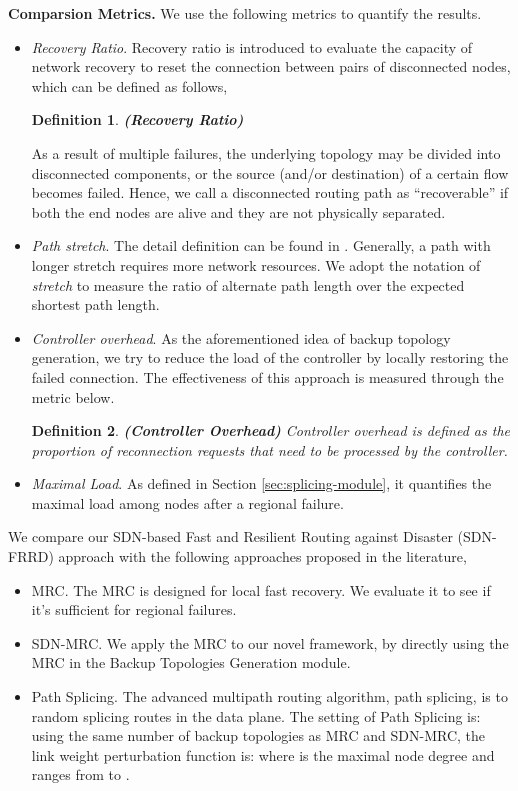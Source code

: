 \documentclass[10pt,journal]{IEEEtran}
\newtheorem{definition}{Definition}
\begin{document}
 \textbf{Comparsion Metrics.} We use the following metrics to quantify the results\cite{motiwala2008path, wangfast}.
\begin{itemize}
\item \emph{Recovery Ratio}.
Recovery ratio is introduced to evaluate the capacity of network recovery to reset the connection between pairs of disconnected nodes, which can be defined as follows,
\begin{definition}
\textbf{(Recovery Ratio)}

\end{definition}
As a result of multiple failures, the underlying topology may be divided into disconnected components, or the source (and/or destination) of a certain flow becomes failed. Hence, we call a disconnected routing path as ``recoverable'' if both the end nodes are alive and they are not physically separated.
\item \emph{Path stretch}. The detail definition can be found in \cite{W13fcr}. Generally, a path with longer stretch requires more network resources. We adopt the notation of \emph{stretch} to measure the ratio of alternate path length over the expected shortest path length.
\item \emph{Controller overhead}. As the aforementioned idea of backup topology generation, we try to reduce the load of the controller by locally restoring the failed connection. The effectiveness of this approach is measured through the metric below.
\begin{definition}
\textbf{(Controller Overhead)}
Controller overhead is defined as the proportion of reconnection requests that need to be processed by the controller.
\end{definition}
\item \emph{Maximal Load}. As defined in Section \ref{sec:splicing-module}, it quantifies the maximal load among nodes after a regional failure.
\end{itemize}


We compare our SDN-based Fast and Resilient Routing against Disaster (SDN-FRRD) approach with the following approaches proposed in the literature,
 \begin{itemize}
\item MRC\cite{kvalbein2006fast}. The MRC is designed for local fast recovery. We evaluate it to see if it's sufficient for regional failures.
\item SDN-MRC. We apply the MRC to our novel framework, by directly using the MRC in the Backup Topologies Generation module.
\item Path Splicing\cite{motiwala2008path}. The advanced multipath routing algorithm, path splicing, is to random splicing routes in the data plane. The setting of Path Splicing is: using the same number of  backup topologies as MRC and SDN-MRC, the link weight perturbation function is:  where  is the maximal node degree and  ranges from  to .
\end{itemize}
\end{document}
